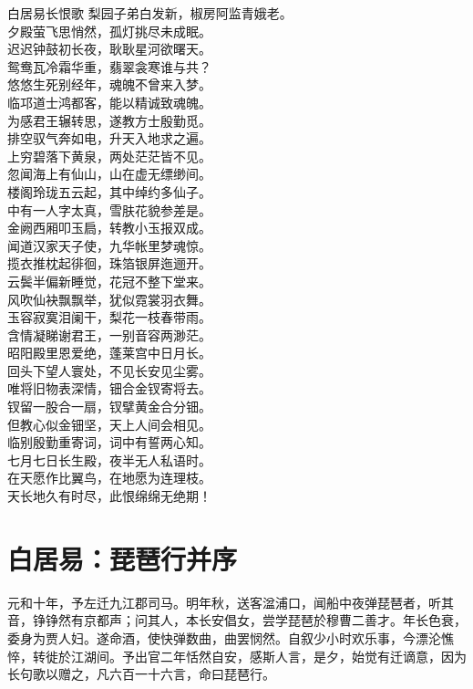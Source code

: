\documentclass[12pt,oneside,a5paper]{book}
\begin{document}
\begin{poemzh}{白居易}{长恨歌}
梨园子弟白发新，椒房阿监青娥老。\\
夕殿萤飞思悄然，孤灯挑尽未成眠。\\
迟迟钟鼓初长夜，耿耿星河欲曙天。\\
鸳鸯瓦冷霜华重，翡翠衾寒谁与共？\\
悠悠生死别经年，魂魄不曾来入梦。\\
临邛道士鸿都客，能以精诚致魂魄。\\
为感君王辗转思，遂教方士殷勤觅。\\
排空驭气奔如电，升天入地求之遍。\\
上穷碧落下黄泉，两处茫茫皆不见。\\
忽闻海上有仙山，山在虚无缥缈间。\\
楼阁玲珑五云起，其中绰约多仙子。\\
中有一人字太真，雪肤花貌参差是。\\
金阙西厢叩玉扃，转教小玉报双成。\\
闻道汉家天子使，九华帐里梦魂惊。\\
揽衣推枕起徘徊，珠箔银屏迤逦开。\\
云鬓半偏新睡觉，花冠不整下堂来。\\
风吹仙袂飘飘举，犹似霓裳羽衣舞。\\
玉容寂寞泪阑干，梨花一枝春带雨。\\
含情凝睇谢君王，一别音容两渺茫。\\
昭阳殿里恩爱绝，蓬莱宫中日月长。\\
回头下望人寰处，不见长安见尘雾。\\
唯将旧物表深情，钿合金钗寄将去。\\
钗留一股合一扇，钗擘黄金合分钿。\\
但教心似金钿坚，天上人间会相见。\\
临别殷勤重寄词，词中有誓两心知。\\
七月七日长生殿，夜半无人私语时。\\
在天愿作比翼鸟，在地愿为连理枝。\\
天长地久有时尽，此恨绵绵无绝期！\\ 
\end{poemzh}

\chapter{白居易：琵琶行并序}
元和十年，予左迁九江郡司马。明年秋，送客湓浦口，闻船中夜弹琵琶者，听其音，铮铮然有京都声；问其人，本长安倡女，尝学琵琶於穆曹二善才。年长色衰，委身为贾人妇。遂命酒，使快弹数曲，曲罢悯然。自叙少小时欢乐事，今漂沦憔悴，转徙於江湖间。予出官二年恬然自安，感斯人言，是夕，始觉有迁谪意，因为长句歌以赠之，凡六百一十六言，命曰琵琶行。
\end{document}
